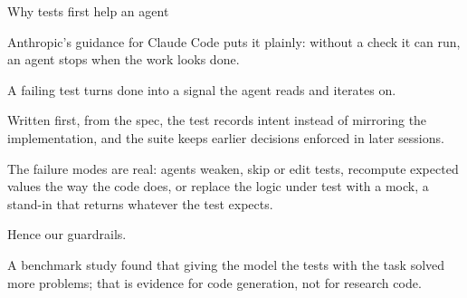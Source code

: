 \begin{frame}[source={Anthropic (2026), Claude Code best practices · Mathews \& Nagappan (2024), ASE ’24}]{Why tests first help an agent}
{    Anthropic's guidance for Claude Code puts it plainly: without a check it can run, an agent
      stops when the work looks done.\par
    A failing test turns done into a signal the agent reads and iterates on.\par
    Written first, from the spec, the test records intent instead of mirroring the
      implementation, and the suite keeps earlier decisions enforced in later sessions.\par
    The failure modes are real: agents weaken, skip or edit tests, recompute expected values the
      way the code does, or replace the logic under test with a mock, a stand-in that returns
      whatever the test expects.\par
    Hence our guardrails.\par
    A benchmark study found that giving the model the tests with the task solved more problems;
      that is evidence for code generation, not for research code.}
\end{frame}


